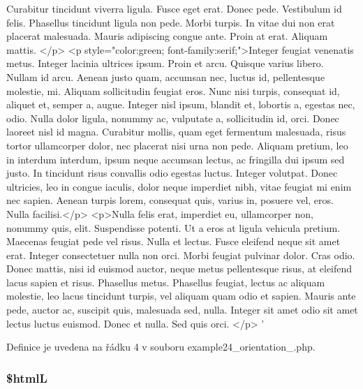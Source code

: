 \begin{DoxyCode}
{       Curabitur tincidunt viverra ligula. Fusce eget erat. Donec pede. Vestibulum id felis. Phasellus tincidunt ligula
       non pede. Morbi turpis. In vitae dui non erat placerat malesuada. Mauris adipiscing congue ante. Proin at
       erat. Aliquam mattis. </p>}
\textcolor{stringliteral}{<p style="color:green; font-family:serif;">Integer feugiat venenatis metus. Integer lacinia ultrices ipsum.
       Proin et arcu. Quisque varius libero. Nullam id arcu. Aenean justo quam, accumsan nec, luctus id,
       pellentesque molestie, mi. Aliquam sollicitudin feugiat eros. Nunc nisi turpis, consequat id, aliquet et, semper a,
       augue. Integer nisl ipsum, blandit et, lobortis a, egestas nec, odio. Nulla dolor ligula, nonummy ac,
       vulputate a, sollicitudin id, orci. Donec laoreet nisl id magna. Curabitur mollis, quam eget fermentum malesuada,
       risus tortor ullamcorper dolor, nec placerat nisi urna non pede. Aliquam pretium, leo in interdum interdum,
       ipsum neque accumsan lectus, ac fringilla dui ipsum sed justo. In tincidunt risus convallis odio egestas
       luctus. Integer volutpat. Donec ultricies, leo in congue iaculis, dolor neque imperdiet nibh, vitae feugiat mi
       enim nec sapien. Aenean turpis lorem, consequat quis, varius in, posuere vel, eros. Nulla facilisi.</p>}
\textcolor{stringliteral}{<p>Nulla felis erat, imperdiet eu, ullamcorper non, nonummy quis, elit. Suspendisse potenti. Ut a eros at
       ligula vehicula pretium. Maecenas feugiat pede vel risus. Nulla et lectus. Fusce eleifend neque sit amet
       erat. Integer consectetuer nulla non orci. Morbi feugiat pulvinar dolor. Cras odio. Donec mattis, nisi id
       euismod auctor, neque metus pellentesque risus, at eleifend lacus sapien et risus. Phasellus metus. Phasellus
       feugiat, lectus ac aliquam molestie, leo lacus tincidunt turpis, vel aliquam quam odio et sapien. Mauris ante
       pede, auctor ac, suscipit quis, malesuada sed, nulla. Integer sit amet odio sit amet lectus luctus euismod.
       Donec et nulla. Sed quis orci. </p>}
\textcolor{stringliteral}{}
\textcolor{stringliteral}{}
\textcolor{stringliteral}{'}
\end{DoxyCode}


Definice je uvedena na řádku 4 v souboru example24\-\_\-orientation\-\_.\-php.

\hypertarget{example24__orientation__2_8php_a3c35d98955ecf26ff4594e9c5a0fa11f}{
\subsubsection[{\$html\-L}]{\setlength{\rightskip}{0pt plus 5cm}\$html\-L}}\label{example24__orientation__2_8php_a3c35d98955ecf26ff4594e9c5a0fa11f}



